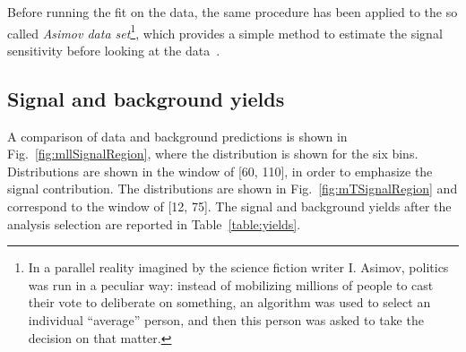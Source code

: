 Before running the fit on the data, the same procedure has been applied to the so called \textit{Asimov data set}\footnote{In a parallel reality imagined by the science fiction writer I. Asimov, politics was run in a peculiar way: instead of mobilizing millions of people to cast their vote to deliberate on something, an algorithm was used to select an individual ``average'' person, and then this person was asked to take the decision on that matter.}, which provides a simple method to estimate the signal sensitivity before looking at the data~\cite{Cowan:2010js}.


\subsection{Signal and background yields}\label{subsec:yields}

A comparison of data and background predictions is shown in Fig.~\ref{fig:mllSignalRegion}, where the \mll{} distribution is shown for the six \pth bins. Distributions are shown in the \mt window of [60, 110]\GeV, in order to emphasize the signal contribution. The \mt distributions are shown in Fig.~\ref{fig:mTSignalRegion} and correspond to the \mll window of [12, 75]\GeV. The signal and background yields after the analysis selection are reported in Table~\ref{table:yields}.

